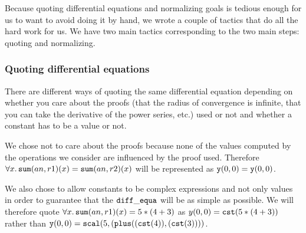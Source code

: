 \documentclass{article}
\begin{document}
Because quoting differential equations and normalizing goals is tedious enough
for us to want to avoid doing it by hand, we wrote a couple of tactics that do
all the hard work for us. We have two main tactics corresponding to the two
main steps: quoting and normalizing.

\subsubsection{Quoting differential equations}

There are different ways of quoting the same differential equation depending on
whether you care about the proofs (that the radius of convergence is infinite,
that you can take the derivative of the power series, etc.) used or not and
whether a constant has to be a value or not.

We chose not to care about the proofs because none of the values computed by the
operations we consider are influenced by the proof used. Therefore
$\forall x. \operatorname{\mathtt{sum}}(an, r1)(x) = \operatorname{\mathtt{sum}}(an, r2)(x)$ will be represented as
$\operatorname{\mathtt{y}}(0,0) = \operatorname{\mathtt{y}}(0,0)$.

We also chose to allow constants to be complex expressions and not only values
in order to guarantee that the $\operatorname{\mathtt{diff\_equa}}$ will be as simple as possible.
We will therefore quote $\forall x. \operatorname{\mathtt{sum}}(an,  r1)(x) = 5 * (4 + 3)$ as
$y(0,0) = \operatorname{\mathtt{cst}} (5 * (4 + 3))$ rather than $\operatorname{\mathtt{y}}(0,0) = \operatorname{\mathtt{scal}} (5, (\operatorname{\mathtt{plus}} ((\operatorname{\mathtt{cst}}(4)),
(\operatorname{\mathtt{cst}}(3))))$.
\end{document}
